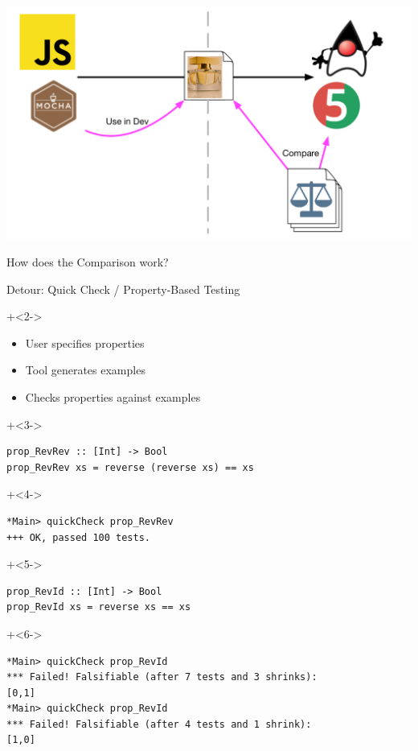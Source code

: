 \begin{frame}[fragile]{}

\includegraphics[width=\textwidth]{images/Essence-4.pdf}

\end{frame}

\begin{frame}[fragile]{}

\begin{center}
{\Huge
How does the Comparison work?
}
\end{center}

\end{frame}

\begin{frame}[fragile]{Detour: Quick Check / Property-Based Testing}

\onslide+<2->
\begin{itemize}
\item User specifies properties
\item Tool generates examples
\item Checks properties against examples
\end{itemize}

\onslide+<3->
\begin{lstlisting}
prop_RevRev :: [Int] ->	Bool
prop_RevRev xs = reverse (reverse xs) == xs
\end{lstlisting}

\onslide+<4->
\begin{lstlisting}
*Main> quickCheck prop_RevRev
+++ OK, passed 100 tests.
\end{lstlisting}

\onslide+<5->
\begin{lstlisting}
prop_RevId :: [Int] -> Bool
prop_RevId xs = reverse xs == xs
\end{lstlisting}

\onslide+<6->
\begin{lstlisting}
*Main> quickCheck prop_RevId 
*** Failed! Falsifiable (after 7 tests and 3 shrinks):    
[0,1]
*Main> quickCheck prop_RevId 
*** Failed! Falsifiable (after 4 tests and 1 shrink):     
[1,0]
\end{lstlisting}

\end{frame}

